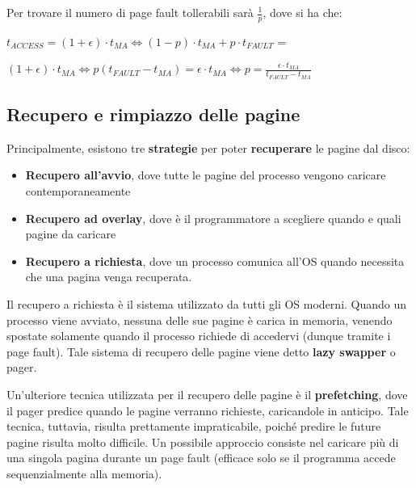 \documentclass{article}
\begin{document}
Per trovare il numero di page fault tollerabili sarà $\frac{1}{p}$, dove si ha che:\par
\begin{center}
    $t_{ACCESS} = (1+\epsilon) \cdot t_{MA} \iff (1-p) \cdot t_{MA} + p \cdot t_{FAULT}$ =\par
    $(1+\epsilon) \cdot t_{MA}\iff p(t_{FAULT} - t_{MA}) = \epsilon \cdot t_{MA} \iff p = \frac{\epsilon \cdot t_{MA}}{t_{FAULT} - t_{MA}}$
\end{center}
    
\pagebreak
\subsection{Recupero e rimpiazzo delle pagine}

Principalmente, esistono tre \textbf{strategie} per poter \textbf{recuperare} le pagine dal disco:
\begin{itemize}
    \item \textbf{Recupero all'avvio}, dove tutte le pagine del processo vengono caricare contemporaneamente
    \item \textbf{Recupero ad overlay}, dove è il programmatore a scegliere quando e quali pagine da caricare
    \item \textbf{Recupero a richiesta}, dove un processo comunica all'OS quando necessita che una pagina venga recuperata.
\end{itemize}
Il recupero a richiesta è il sistema utilizzato da tutti gli OS moderni. Quando un processo viene avviato, nessuna delle sue pagine è carica in memoria, venendo spostate solamente quando il processo richiede di accedervi (dunque tramite i page fault). Tale sistema di recupero delle pagine viene detto \textbf{lazy swapper} o pager.\par
Un'ulteriore tecnica utilizzata per il recupero delle pagine è il \textbf{prefetching}, dove il pager predice quando le pagine verranno richieste, caricandole in anticipo. Tale tecnica, tuttavia, risulta prettamente impraticabile, poiché predire le future pagine risulta molto difficile. Un possibile approccio consiste nel caricare più di una singola pagina durante un page fault (efficace solo se il programma accede sequenzialmente alla memoria).\par
\end{document}
